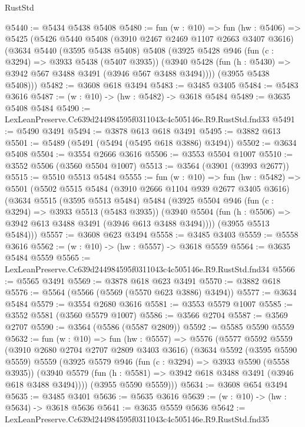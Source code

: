 \begin{lexlean}{RustStd}
\begin{coremodule}
@5440 := @5434 @5438 @5408
@5480 := fun (w : @10) =>
  fun (hw : @5406) =>
  @5425
    (@5426
      @5440
      @5408
      (@3910 @2467 @2469 @1107 @2663 @3407 @3616)
      (@3634
        @5440
        (@3595 @5438 @5408)
        @5408
        (@3925
          @5428
          @946
          (fun (c : @3294) => @3933 @5438 (@5407 @3935))
          (@3940 @5428 (fun (h : @5430) => @3942 @567 @3488 @3491 (@3946 @567 @3488 @3494))))
        (@3955 @5438 @5408)))
@5482 := @3608 @618 @3494
@5483 := @3485 @3405
@5484 := @5483 @3616
@5487 := (w : @10) -> (hw : @5482) -> @3618 @5484
@5489 := @3635 @5408 @5484
@5490 := LexLeanPreserve.Cc639d244984595f0311043c4c505146e.R9.RustStd.fnd33
@5491 := @5490 @3491
@5494 := @3878 @613 @618 @3491
@5495 := @3882 @613
@5501 := @5489 (@5491 (@5494 (@5495 @618 @3886) @3494))
@5502 := @3634 @5408
@5504 := @3554 @2666 @3616
@5506 := @3553 @5504 @1007
@5510 := @3552 @5506 (@3560 @5504 @1007)
@5513 := @3564 (@3901 (@3993 @2677))
@5515 := @5510 @5513 @5484
@5555 := fun (w : @10) =>
  fun (hw : @5482) =>
  @5501
    (@5502
      @5515
      @5484
      (@3910 @2666 @1104 @939 @2677 @3405 @3616)
      (@3634
        @5515
        (@3595 @5513 @5484)
        @5484
        (@3925
          @5504
          @946
          (fun (c : @3294) => @3933 @5513 (@5483 @3935))
          (@3940 @5504 (fun (h : @5506) => @3942 @613 @3488 @3491 (@3946 @613 @3488 @3494))))
        (@3955 @5513 @5484)))
@5557 := @3608 @623 @3494
@5558 := @3485 @3403
@5559 := @5558 @3616
@5562 := (w : @10) -> (hw : @5557) -> @3618 @5559
@5564 := @3635 @5484 @5559
@5565 := LexLeanPreserve.Cc639d244984595f0311043c4c505146e.R9.RustStd.fnd34
@5566 := @5565 @3491
@5569 := @3878 @618 @623 @3491
@5570 := @3882 @618
@5576 := @5564 (@5566 (@5569 (@5570 @623 @3886) @3494))
@5577 := @3634 @5484
@5579 := @3554 @2680 @3616
@5581 := @3553 @5579 @1007
@5585 := @3552 @5581 (@3560 @5579 @1007)
@5586 := @3566 @2704
@5587 := @3569 @2707
@5590 := @3564 (@5586 (@5587 @2809))
@5592 := @5585 @5590 @5559
@5632 := fun (w : @10) =>
  fun (hw : @5557) =>
  @5576
    (@5577
      @5592
      @5559
      (@3910 @2680 @2704 @2707 @2809 @3403 @3616)
      (@3634
        @5592
        (@3595 @5590 @5559)
        @5559
        (@3925
          @5579
          @946
          (fun (c : @3294) => @3933 @5590 (@5558 @3935))
          (@3940 @5579 (fun (h : @5581) => @3942 @618 @3488 @3491 (@3946 @618 @3488 @3494))))
        (@3955 @5590 @5559)))
@5634 := @3608 @654 @3494
@5635 := @3485 @3401
@5636 := @5635 @3616
@5639 := (w : @10) -> (hw : @5634) -> @3618 @5636
@5641 := @3635 @5559 @5636
@5642 := LexLeanPreserve.Cc639d244984595f0311043c4c505146e.R9.RustStd.fnd35

\end{coremodule}
\end{lexlean}

